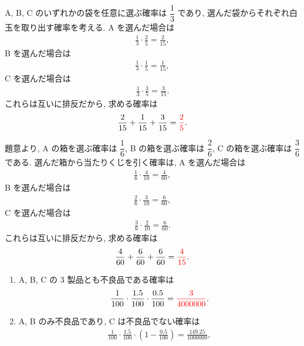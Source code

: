 \vspace{\baselineskip}
\stepup
\begin{qenumerate}
	\item{
		A, B, C のいずれかの袋を任意に選ぶ確率は $\dfrac{1}{3}$ であり, 選んだ袋からそれぞれ白玉を取り出す確率を考える.
		A を選んだ場合は
		\begin{align}
			\frac{1}{3}\cdot\frac{2}{5} = \frac{2}{15}, 
		\end{align}
		B を選んだ場合は
		\begin{align}
			\frac{1}{3}\cdot\frac{1}{5} = \frac{1}{15}, 
		\end{align}
		C を選んだ場合は
		\begin{align}
			\frac{1}{3}\cdot\frac{3}{5} = \frac{3}{15}.
		\end{align}
		これらは互いに排反だから, 求める確率は
		\begin{align}
			\frac{2}{15} + \frac{1}{15} + \frac{3}{15} = \textcolor{red}{\frac{2}{5}}.
		\end{align}
	}
	\item{
		題意より, A の箱を選ぶ確率は $\dfrac{1}{6}$, B の箱を選ぶ確率は $\dfrac{2}{6}$, C の箱を選ぶ確率は $\dfrac{3}{6}$ である.
		選んだ箱から当たりくじを引く確率は, A を選んだ場合は
		\begin{align}
			\frac{1}{6}\cdot\frac{4}{10} = \frac{4}{60}, 
		\end{align}
		B を選んだ場合は
		\begin{align}
			\frac{2}{6}\cdot\frac{3}{10} = \frac{6}{60}, 
		\end{align}
		C を選んだ場合は
		\begin{align}
			\frac{3}{6}\cdot\frac{2}{10} = \frac{6}{60}.
		\end{align}
		これらは互いに排反だから, 求める確率は
		\begin{align}
			\frac{4}{60} + \frac{6}{60} + \frac{6}{60} = \textcolor{red}{\frac{4}{15}}.
		\end{align}
	}
	\item{
		\begin{enumerate}
		\item{
			A, B, C の 3 製品とも不良品である確率は
			\begin{align}
				\frac{1}{100}\cdot\frac{1.5}{100}\cdot\frac{0.5}{100} = \textcolor{red}{\frac{3}{4000000}}.
			\end{align}
		}
		\item{
			A, B のみ不良品であり, C は不良品でない確率は
			\begin{align}
				\frac{1}{100}\cdot\frac{1.5}{100}\cdot\left(1 - \frac{0.5}{100}\right) = \frac{149.25}{1000000}, 

\end{align}}
\end{enumerate}}
\end{qenumerate}
